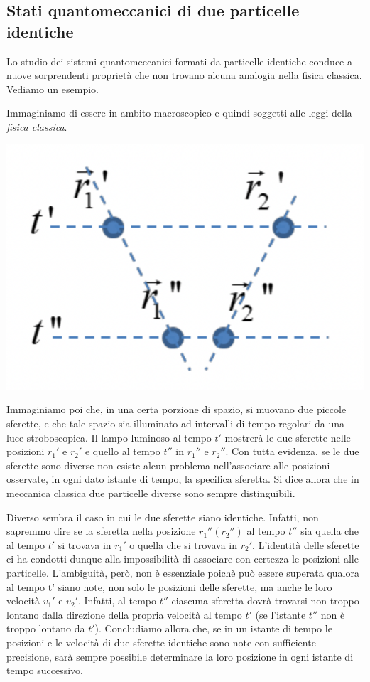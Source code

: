 \subsection{Stati quantomeccanici di due particelle identiche}\label{sec:particelle-identiche}

Lo studio dei sistemi quantomeccanici formati da particelle identiche conduce a nuove
sorprendenti proprietà che non trovano alcuna analogia nella fisica
classica.
Vediamo un esempio.

Immaginiamo di essere in ambito macroscopico e quindi soggetti alle
leggi della \emph{fisica classica}.
\begin{marginfigure}
	\includegraphics{figs/identical-part1}
	\label{fig:identical-part1}
\end{marginfigure}
Immaginiamo poi che, in una certa porzione di spazio, si muovano due
piccole sferette, e che tale spazio sia illuminato ad intervalli di
tempo regolari da una luce stroboscopica.
Il lampo luminoso al tempo
\(t'\) mostrerà le due sferette nelle posizioni \(r_{1}'\) e \(r_{2}'\)
e quello al tempo \(t''\) in \(r_{1}''\) e \(r_{2}''\).
Con tutta
evidenza, se le due sferette sono diverse non esiste alcun problema
nell'associare alle posizioni osservate, in ogni dato istante di tempo,
la specifica sferetta.
Si dice allora che in meccanica classica due
particelle diverse sono sempre distinguibili.

Diverso sembra il caso in cui le due sferette siano identiche.
Infatti,
non sapremmo dire se la sferetta nella posizione \(r_{1}''(r_{2}'')\) al
tempo \(t''\) sia quella che al tempo \(t'\) si trovava in \(r_{1}'\) o
quella che si trovava in \(r_{2}'\).
L'identità delle sferette ci ha
condotti dunque alla impossibilità di associare con certezza le
posizioni alle particelle.
L'ambiguità, però, non è essenziale poichè
può essere superata qualora al tempo t' siano note, non solo le
posizioni delle sferette, ma anche le loro velocità \(v_1'\) e \(v_2'\).
Infatti, al tempo \(t''\) ciascuna sferetta dovrà trovarsi non troppo
lontano dalla direzione della propria velocità al tempo \(t'\) (se
l'istante \(t''\) non è troppo lontano da \(t'\)).
Concludiamo allora
che, se in un istante di tempo le posizioni e le velocità di due
sferette identiche sono note con sufficiente precisione, sarà sempre
possibile determinare la loro posizione in ogni istante di tempo
successivo.

